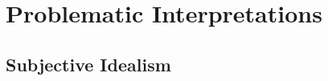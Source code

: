 \chapter{Problematic Interpretations}
\label{chapter:problematic_interpretations}

\section{Subjective Idealism}


